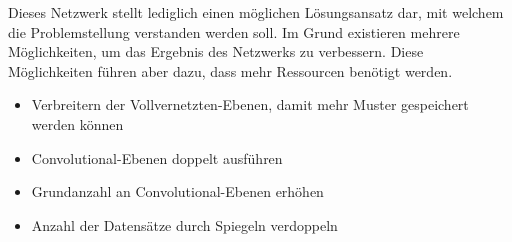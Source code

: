 Dieses Netzwerk stellt lediglich einen möglichen Lösungsansatz dar, mit welchem die Problemstellung verstanden werden soll. 
Im Grund existieren mehrere Möglichkeiten, um das Ergebnis des Netzwerks zu verbessern. 
Diese Möglichkeiten führen aber dazu, dass mehr Ressourcen benötigt werden. 
\begin{itemize}
	\item Verbreitern der Vollvernetzten-Ebenen, damit mehr Muster gespeichert werden können
	\item Convolutional-Ebenen doppelt ausführen 
	\item Grundanzahl an Convolutional-Ebenen erhöhen
	\item Anzahl der Datensätze durch Spiegeln verdoppeln
\end{itemize}






